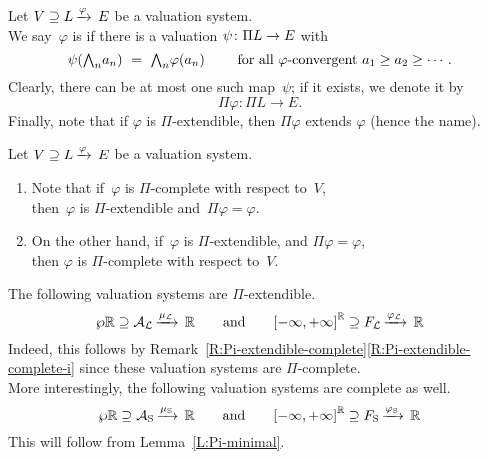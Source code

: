 \documentclass[main.tex]{subfiles}
\begin{document}
\begin{dfn}
\label{D:Pi-extendible}
Let $V \supseteq L\,\smash{\xrightarrow{\varphi}\,E}$ be a valuation system.\\
We say~$\varphi$ is 
if there is a valuation $\psi \colon \Pi L \rightarrow E$ with
\begin{equation*}
\psi ( \bw_n a_n )
\ =\ 
\bw_n \varphi(a_n) 
\qquad
\text{ for all $\varphi$-convergent }
a_1 \geq a_2 \geq \dotsb.
\end{equation*}
Clearly,
there can be at most one such map~$\psi$;
if it exists, we denote it by 
\begin{equation*}
\Pi \varphi\colon \Pi L \longrightarrow E.
\end{equation*}
Finally,
note that if $\varphi$ is $\Pi$-extendible,
then $\Pi\varphi$ extends $\varphi$ (hence the name).
\end{dfn}
%
%
\begin{rem}
\label{R:Pi-extendible-complete}
Let $V \supseteq L\,\smash{\xrightarrow{\varphi}\,E}$ be a valuation system.
\begin{enumerate}
\item
\label{R:Pi-extendible-complete-i}
Note that if~$\varphi$ is $\Pi$-complete
with respect to~$V$,\\
then~$\varphi$ is $\Pi$-extendible and~$\Pi\varphi=\varphi$.

\item
On the other hand,
if~$\varphi$ is $\Pi$-extendible,
and $\Pi\varphi=\varphi$,\\
then $\varphi$ is $\Pi$-complete
with respect to~$V$.
\end{enumerate}
\end{rem}
%
%
\begin{ex}
The following valuation systems are $\Pi$-extendible.
\begin{equation*}
\wp{\mathbb{R}} \supseteq \mathcal{A}_{\mathcal{L}}\,\smash{\xrightarrow{\mu_{\mathcal{L}}}\,\mathbb{R}}\qquad\text{and}\qquad{[-\infty,+\infty]}^{\mathbb{R}} \supseteq F_{\mathcal{L}}\,\smash{\xrightarrow{\varphi_{\mathcal{L}}}\,\mathbb{R}}
\end{equation*}
Indeed, this follows by 
Remark~\ref{R:Pi-extendible-complete}\ref{R:Pi-extendible-complete-i}
since these valuation systems are $\Pi$-complete.\\
More interestingly,
the following valuation systems are complete as well.
\begin{equation*}
\wp{\mathbb{R}} \supseteq \mathcal{A}_{\mathrm{S}}\,\smash{\xrightarrow{\mu_{\mathrm{S}}}\,\mathbb{R}}\qquad\text{and}\qquad{[-\infty,+\infty]}^{\mathbb{R}} \supseteq F_{\mathrm{S}}\,\smash{\xrightarrow{\varphi_{\mathrm{S}}}\,\mathbb{R}}
\end{equation*}
This will follow from Lemma~\ref{L:Pi-minimal}.
\end{ex}
\end{document}
